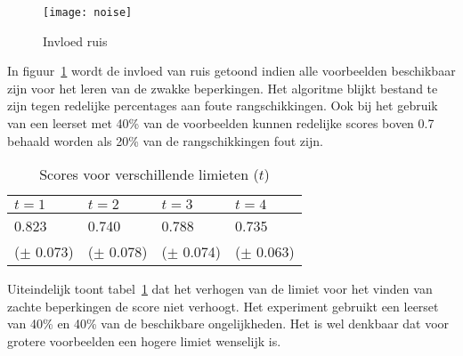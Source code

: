 \begin{figure}

  \centering
    \texttt{[image: noise]}
  \caption{Invloed ruis}
  \label{fig:ruis}

\end{figure}

In figuur~\ref{fig:ruis} wordt de invloed van ruis getoond indien alle voorbeelden beschikbaar zijn voor het leren van de zwakke beperkingen.
Het algoritme blijkt bestand te zijn tegen redelijke percentages aan foute rangschikkingen.
Ook bij het gebruik van een leerset met 40\% van de voorbeelden kunnen redelijke scores boven 0.7 behaald worden als 20\% van de rangschikkingen fout zijn.

  \begin{table}
    \caption{Scores voor verschillende limieten ($t$)}
    \begin{tabularx}{\linewidth}{XXXX}
      $t = 1$ & $t = 2$ & $t = 3$ & $t = 4$ \\
      \toprule
     0.823 & 0.740 & 0.788 & 0.735 \\
     ($\pm$ 0.073)&
($\pm$ 0.078)&
($\pm$ 0.074)&
($\pm$ 0.063)
    \end{tabularx}
    \label{tbl:limiet}
  \end{table}

Uiteindelijk toont tabel~\ref{tbl:limiet} dat het verhogen van de limiet voor het vinden van zachte beperkingen de score niet verhoogt.
Het experiment gebruikt een leerset van 40\% en 40\% van de beschikbare ongelijkheden.
Het is wel denkbaar dat voor grotere voorbeelden een hogere limiet wenselijk is.

%
%


